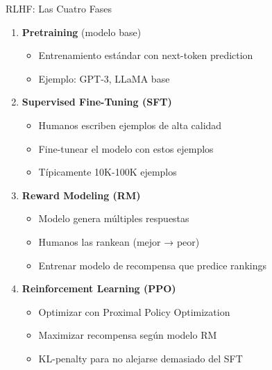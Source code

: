 \begin{frame}{RLHF: Las Cuatro Fases}

\begin{enumerate}
    \item \textbf{Pretraining} (modelo base)
    \begin{itemize}
        \item Entrenamiento estándar con next-token prediction
        \item Ejemplo: GPT-3, LLaMA base
    \end{itemize}
    
    \vspace{0.3em}
    
    \item \textbf{Supervised Fine-Tuning (SFT)}
    \begin{itemize}
        \item Humanos escriben ejemplos de alta calidad
        \item Fine-tunear el modelo con estos ejemplos
        \item Típicamente 10K-100K ejemplos
    \end{itemize}
    
    \vspace{0.3em}
    
    \item \textbf{Reward Modeling (RM)}
    \begin{itemize}
        \item Modelo genera múltiples respuestas
        \item Humanos las rankean (mejor → peor)
        \item Entrenar modelo de recompensa que predice rankings
    \end{itemize}
    
    \vspace{0.3em}
    
    \item \textbf{Reinforcement Learning (PPO)}
    \begin{itemize}
        \item Optimizar con Proximal Policy Optimization
        \item Maximizar recompensa según modelo RM
        \item KL-penalty para no alejarse demasiado del SFT
    \end{itemize}
\end{enumerate}

\end{frame}

